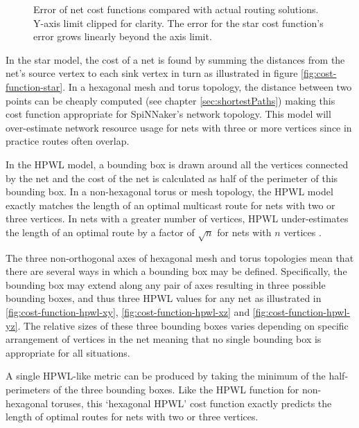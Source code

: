			\begin{figure}
				\center
				
				\caption{Error of net cost functions compared with actual routing
				solutions. Y-axis limit clipped for clarity. The error for the star
				cost function's error grows linearly beyond the axis limit.}
				\label{fig:cost-function-error}
			\end{figure}
			
			In the star model, the cost of a net is found by summing the distances
			from the net's source vertex to each sink vertex in turn as illustrated
			in figure \ref{fig:cost-function-star}. In a hexagonal mesh and torus
			topology, the distance between two points can be cheaply computed (see
			chapter \ref{sec:shortestPaths}) making this cost function appropriate
			for SpiNNaker's network topology. This model will over-estimate network
			resource usage for nets with three or more vertices since in practice
			routes often overlap.
			
			In the HPWL model, a bounding box is drawn around all the vertices
			connected by the net and the cost of the net is calculated as half of the
			perimeter of this bounding box. In a non-hexagonal torus or mesh
			topology, the HPWL model exactly matches the length of an optimal
			multicast route for nets with two or three vertices. In nets with a
			greater number of vertices, HPWL under-estimates the length of an optimal
			route by a factor of $\sqrt{n}$ for nets with $n$ vertices
			\cite{chung79}.
			
			The three non-orthogonal axes of hexagonal mesh and torus topologies mean
			that there are several ways in which a bounding box may be defined.
			Specifically, the bounding box may extend along any pair of axes
			resulting in three possible bounding boxes, and thus three HPWL values
			for any net as illustrated in \ref{fig:cost-function-hpwl-xy},
			\ref{fig:cost-function-hpwl-xz} and \ref{fig:cost-function-hpwl-yz}. The
			relative sizes of these three bounding boxes varies depending on specific
			arrangement of vertices in the net meaning that no single bounding box is
			appropriate for all situations.
			
			A single HPWL-like metric can be produced by taking the minimum of the
			half-perimeters of the three bounding boxes. Like the HPWL function for
			non-hexagonal toruses, this `hexagonal HPWL' cost function exactly
			predicts the length of optimal routes for nets with two or three
			vertices.
			
